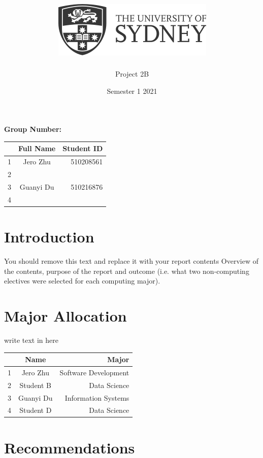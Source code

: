 \documentclass[12pt]{article}
\title{\includegraphics[scale=.5]{usydlogo.png}
\linebreak \\
\noindent \scalebox{1}{\helveticafamily INFO1111: Computing 1A Professionalism}
}
\date{Semester 1 2021}
\author{Project 2B}
\begin{document}
\maketitle
\begin{center}
    \textbf{Group Number:}
\end{center}


\begin{center}
\begin{tabular}{|l|c|r|}
\hline
  & Full Name & Student ID \\ \hline
1 & Jero Zhu  & 510208561  \\ \hline
2 &           &            \\ \hline
3 & Guanyi Du & 510216876  \\ \hline
4 &           &            \\ \hline
\end{tabular}
\end{center}

\thispagestyle{empty}
\newpage

\tableofcontents %

\setcounter{page}{1}
\newpage
\section{Introduction}
You should remove this text and replace it with your report contents
Overview of the contents, purpose of the report and outcome (i.e. what two non-computing electives were selected for each computing major).

\newpage
\section{Major Allocation}
write text in here
\begin{center}
\begin{tabular}{|l|c|r|}
\hline
  & Name      & Major                \\ \hline
1 & Jero Zhu  & Software Development \\ \hline
2 & Student B & Data Science        \\ \hline
3 & Guanyi Du & Information Systems  \\ \hline
4 & Student D & Data Science         \\ \hline
\end{tabular}
\end{center}

\newpage
\section{Recommendations}
\end{document}
